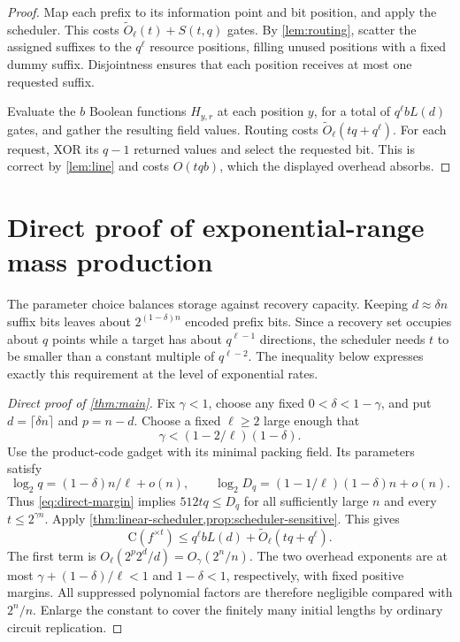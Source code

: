 \documentclass[11pt]{article}
\newcommand{\C}{\mathrm{C}}
\begin{document}
\begin{proof}
Map each prefix to its information point and bit position, and apply the
scheduler.  This costs $\widetilde O_\ell(t)+S(t,q)$ gates.  By
\cref{lem:routing}, scatter the assigned suffixes to the $q^\ell$ resource
positions, filling unused positions with a fixed dummy suffix.  Disjointness
ensures that each position receives at most one requested suffix.

Evaluate the $b$ Boolean functions $H_{y,r}$ at each position $y$, for a
total of $q^\ell bL(d)$ gates, and gather the resulting field values.
Routing costs $\widetilde O_\ell(tq+q^\ell)$.  For each request, XOR its
$q-1$ returned values and select the requested bit.  This is correct by
\cref{lem:line} and costs $O(tqb)$, which the displayed overhead absorbs.
\end{proof}

\section{Direct proof of exponential-range mass production}\label{sec:direct}

The parameter choice balances storage against recovery capacity.  Keeping
$d\approx\delta n$ suffix bits leaves about $2^{(1-\delta)n}$ encoded
prefix bits.  Since a recovery set occupies about $q$ points while a target
has about $q^{\ell-1}$ directions, the scheduler needs $t$ to be smaller
than a constant multiple of $q^{\ell-2}$.  The inequality below expresses
exactly this requirement at the level of exponential rates.

\begin{proof}[Direct proof of \cref{thm:main}]
Fix $\gamma<1$, choose any fixed $0<\delta<1-\gamma$, and put
$d=\lceil\delta n\rceil$ and $p=n-d$.  Choose a fixed $\ell\ge2$ large
enough that
\begin{equation}\label{eq:direct-margin}
  \gamma<(1-2/\ell)(1-\delta).
\end{equation}
Use the product-code gadget with its minimal packing field.  Its parameters
satisfy
\[
  \log_2q=(1-\delta)n/\ell+o(n),\qquad
  \log_2D_q=(1-1/\ell)(1-\delta)n+o(n).
\]
Thus \eqref{eq:direct-margin} implies $512tq\le D_q$ for all sufficiently
large $n$ and every $t\le2^{\gamma n}$.  Apply
\cref{thm:linear-scheduler,prop:scheduler-sensitive}.  This gives
\[
  \C(f^{\times t})\le q^\ell bL(d)
                 +\widetilde O_\ell(tq+q^\ell).
\]
The first term is $O_\ell(2^p2^d/d)=O_\gamma(2^n/n)$.  The two overhead
exponents are at most $\gamma+(1-\delta)/\ell<1$ and $1-\delta<1$,
respectively, with fixed positive margins.  All suppressed polynomial factors
are therefore negligible compared with $2^n/n$.  Enlarge the constant to
cover the finitely many initial lengths by ordinary circuit replication.
\end{proof}
\end{document}
